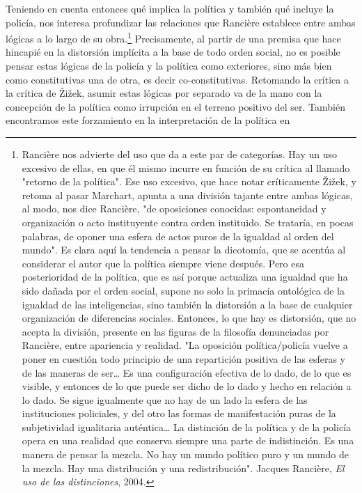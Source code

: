 \documentclass{book}
\begin{document}
Teniendo en cuenta entonces qué implica la política y también qué
incluye la policía, nos interesa profundizar las relaciones que Rancière
establece entre ambas lógicas a lo largo de su obra.\footnote{Rancière
  nos advierte del uso que da a este par de categorías. Hay un uso
  excesivo de ellas, en que él mismo incurre en función de su crítica al
  llamado "retorno de la política". Ese uso excesivo, que hace notar
  críticamente Žižek, y retoma al pasar Marchart, apunta a una división
  tajante entre ambas lógicas, al modo, nos dice Rancière, "de
  oposiciones conocidas: espontaneidad y organización o acto
  instituyente contra orden instituido. Se trataría, en pocas palabras,
  de oponer una esfera de actos puros de la igualdad al orden del
  mundo". Es clara aquí la tendencia a pensar la dicotomía, que se
  acentúa al considerar el autor que la política siempre viene después.
  Pero esa posterioridad de la política, que es así porque actualiza una
  igualdad que ha sido dañada por el orden social, supone no solo la
  primacía ontológica de la igualdad de las inteligencias, sino también
  la distorsión a la base de cualquier organización de diferencias
  sociales. Entonces, lo que hay es distorsión, que no acepta la
  división, presente en las figuras de la filosofía denunciadas por
  Rancière, entre apariencia y realidad. "La oposición política/policía
  vuelve a poner en cuestión todo principio de una repartición positiva
  de las esferas y de las maneras de ser\ldots{} Es una configuración
  efectiva de lo dado, de lo que es visible, y entonces de lo que puede
  ser dicho de lo dado y hecho en relación a lo dado. Se sigue
  igualmente que no hay de un lado la esfera de las instituciones
  policiales, y del otro las formas de manifestación puras de la
  subjetividad igualitaria auténtica\ldots{} La distinción de la
  política y de la policía opera en una realidad que conserva siempre
  una parte de indistinción. Es una manera de pensar la mezcla. No hay
  un mundo político puro y un mundo de la mezcla. Hay una distribución y
  una redistribución". Jacques Rancière, \emph{El uso de las
  distinciones}, 2004.} Precisamente, al partir de una premisa que hace
hincapié en la distorsión implícita a la base de todo orden social, no
es posible pensar estas lógicas de la policía y la política como
exteriores, sino más bien como constitutivas una de otra, es decir
co-constitutivas. Retomando la crítica a la crítica de Žižek, asumir
estas lógicas por separado va de la mano con la concepción de la
política como irrupción en el terreno positivo del ser. También
encontramos este forzamiento en la interpretación de la política en
\end{document}
